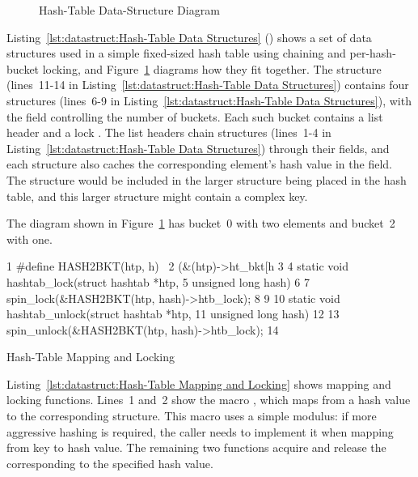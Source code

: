 \begin{figure}[tb]
\centering
{}
\caption{Hash-Table Data-Structure Diagram}
\label{fig:datastruct:Hash-Table Data-Structure Diagram}
\end{figure}

Listing~\ref{lst:datastruct:Hash-Table Data Structures}
()
shows a set of data structures used in a simple fixed-sized hash
table using chaining and per-hash-bucket locking, and
Figure~\ref{fig:datastruct:Hash-Table Data-Structure Diagram}
diagrams how they fit together.
The  structure (lines~11-14 in
Listing~\ref{lst:datastruct:Hash-Table Data Structures})
contains four  structures (lines~6-9 in
Listing~\ref{lst:datastruct:Hash-Table Data Structures}),
with the  field controlling the number of buckets.
Each such bucket contains a list header  and
a lock .
The list headers chain  structures
(lines~1-4 in
Listing~\ref{lst:datastruct:Hash-Table Data Structures})
through their
 fields, and each  structure also caches
the corresponding element's hash value in the  field.
The  structure would be included in the larger structure
being placed in the hash table, and this larger structure might contain
a complex key.

The diagram shown in
Figure~\ref{fig:datastruct:Hash-Table Data-Structure Diagram}
has bucket~0 with two elements and bucket~2 with one.

\begin{listing}[tb]
{ \scriptsize
\begin{verbbox}
 1 #define HASH2BKT(htp, h) \
 2   (&(htp)->ht_bkt[h %
 3 
 4 static void hashtab_lock(struct hashtab *htp,
 5                          unsigned long hash)
 6 {
 7   spin_lock(&HASH2BKT(htp, hash)->htb_lock);
 8 }
 9 
10 static void hashtab_unlock(struct hashtab *htp,
11                            unsigned long hash)
12 {
13   spin_unlock(&HASH2BKT(htp, hash)->htb_lock);
14 }
\end{verbbox}
}
\centering
\theverbbox
\caption{Hash-Table Mapping and Locking}
\label{lst:datastruct:Hash-Table Mapping and Locking}
\end{listing}

Listing~\ref{lst:datastruct:Hash-Table Mapping and Locking}
shows mapping and locking functions.
Lines~1 and~2 show the macro , which maps from a hash value
to the corresponding \co{ht_bucket} structure.
This macro uses a simple modulus: if more aggressive hashing is required,
the caller needs to implement it when mapping from key to hash value.
The remaining two functions acquire and release the \co{->htb_lock}
corresponding to the specified hash value.

